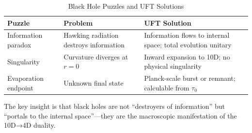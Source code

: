 \begin{table}[htbp]
\centering
\caption{Black Hole Puzzles and UFT Solutions}
\begin{tabular}{@{}lp{5cm}p{5cm}@{}}
\toprule
\textbf{Puzzle} & \textbf{Problem} & \textbf{UFT Solution} \\
\midrule
Information paradox & Hawking radiation destroys information & Information flows to internal space; total evolution unitary \\
Singularity & Curvature diverges at $r = 0$ & Inward expansion to 10D; no physical singularity \\
Evaporation endpoint & Unknown final state & Planck-scale burst or remnant; calculable from $\tau_0$ \\
\bottomrule
\end{tabular}
\end{table}

The key insight is that black holes are not ``destroyers of information'' but ``portals to the internal space''—they are the macroscopic manifestation of the 10D→4D duality.

